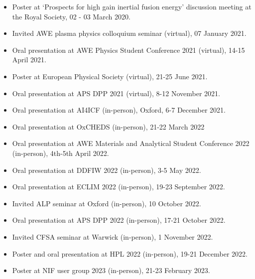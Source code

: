 \begin{itemize}
	\item Poster at `Prospects for high gain inertial fusion energy' discussion meeting at the Royal Society, 02 - 03 March 2020.
	\item Invited AWE plasma physics colloquium seminar (virtual), 07 January 2021.
	\item Oral presentation at AWE Physics Student Conference 2021 (virtual), 14-15 April 2021.
	\item Poster at European Physical Society (virtual), 21-25 June 2021.
	\item Oral presentation at APS DPP 2021 (virtual), 8-12 November 2021.
	\item Oral presentation at AI4ICF (in-person), Oxford, 6-7 December 2021.
	\item Oral presentation at OxCHEDS (in-person), 21-22 March 2022
	\item Oral presentation at AWE Materials and Analytical Student Conference 2022 (in-person), 4th-5th April 2022. 
	\item Oral presentation at DDFIW 2022 (in-person), 3-5 May 2022.
	\item Oral presentation at ECLIM 2022 (in-person), 19-23 September 2022.
	\item Invited ALP seminar at Oxford (in-person), 10 October 2022.
	\item Oral presentation at APS DPP 2022 (in-person), 17-21 October 2022.
	\item Invited CFSA seminar at Warwick (in-person), 1 November 2022.
	\item Poster and oral presentation at HPL 2022 (in-person), 19-21 December 2022.
	\item Poster at NIF user group 2023 (in-person), 21-23 February 2023.
\end{itemize}


